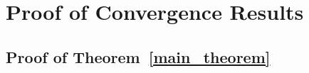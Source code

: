 \documentclass{article} %
\begin{document}





\newpage
\appendix
\section{Proof of Convergence Results}

\subsection{Proof of Theorem~\ref{main_theorem}}
\label{theorem_1_proof}
\end{document}

